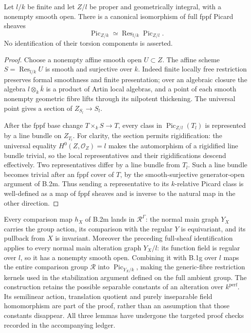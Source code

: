 \begin{lemma}
\label{B:Pic-finite-constants-sheaf}
Let $l/k$ be finite and let $Z/l$ be proper and geometrically
integral, with a nonempty smooth open.  There is a canonical
isomorphism of full fppf Picard sheaves
\[
 \operatorname{Pic}_{Z/k}\simeq
 \operatorname{Res}_{l/k}\operatorname{Pic}_{Z/l}.
\]
No identification of their torsion components is asserted.
\end{lemma}
\begin{proof}
Choose a nonempty affine smooth open $U\subset Z$.
The affine scheme $S=\operatorname{Res}_{l/k}U$ is smooth
and surjective over $k$.  Indeed finite locally free restriction
preserves formal smoothness and finite presentation; over an
algebraic closure the algebra $l\otimes_k\bar k$ is a product
of Artin local algebras, and a point of each smooth nonempty
geometric fibre lifts through its nilpotent thickening.
The universal point gives a section of $Z_{S_l}\to S_l$.

After the fppf base change $T\times_kS\to T$, every class in
$\operatorname{Pic}_{Z/l}(T_l)$ is represented by a line bundle
on $Z_{T_l}$.  For clarity, the section permits rigidification:
the universal equality $H^0(Z,\mathcal O_Z)=l$ makes the
automorphism of a rigidified line bundle trivial, so the local
representatives and their rigidifications descend effectively.
Two representatives differ by a line bundle from $T_l$.
Such a line bundle becomes trivial after an fppf cover of $T$,
by the smooth-surjective generator-open argument of B.2m.
Thus sending a representative to its $k$-relative Picard class
is well-defined as a map of fppf sheaves and is inverse to the
natural map in the other direction.
\end{proof}

\begin{remark}
Every comparison map $h_X$ of B.2m lands in
$\mathcal R^\Gamma$: the normal main graph $Y_X$ carries the
group action, its comparison with the regular $Y$ is
equivariant, and its pullback from $X$ is invariant.
Moreover the preceding full-sheaf identification applies to
every normal main alteration graph $Y_X/l$: its function field
is regular over $l$, so it has a nonempty smooth open.  Combining
it with B.1g over $l$ maps the entire comparison group
$\mathcal R$ into $\operatorname{Pic}_{Y_X/k}$, making the
generic-fibre restriction kernels used in the stabilization
argument defined on the full ambient group.
The construction retains the possible separable constants of an
alteration over $k^{\mathrm{perf}}$.  Its semilinear action,
translation quotient and purely inseparable field homomorphism
are part of the proof, rather than an assumption that those
constants disappear.  All three lemmas have undergone the
targeted proof checks recorded in the accompanying ledger.
\end{remark}
